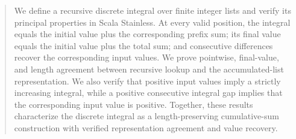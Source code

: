 \begin{abstract}
We define a recursive discrete integral over finite integer lists and verify
its principal properties in Scala Stainless. At every valid position, the
integral equals the initial value plus the corresponding prefix sum; its
final value equals the initial value plus the total sum; and consecutive
differences recover the corresponding input values. We prove pointwise,
final-value, and length agreement between recursive lookup and the
accumulated-list representation. We also verify that positive input values
imply a strictly increasing integral, while a positive consecutive integral
gap implies that the corresponding input value is positive. Together, these
results characterize the discrete integral as a length-preserving
cumulative-sum construction with verified representation agreement and value
recovery.
\end{abstract}
